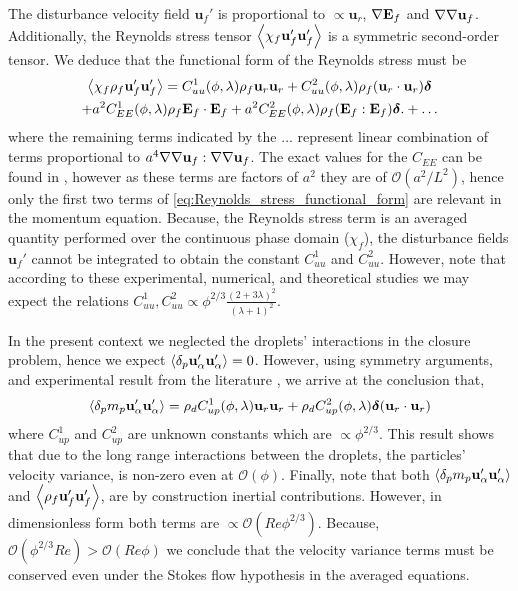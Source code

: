 The disturbance velocity field $\textbf{u}_f'$ is proportional to $\propto \textbf{u}_r$, $\mathbf{\nabla}\textbf{E}_f$ and $\mathbf{\nabla}\mathbf{\nabla} \textbf{u}_f$.
Additionally, the Reynolds stress tensor $\left<\chi_f \textbf{u}_f'\textbf{u}_f'\right>$ is a symmetric second-order tensor. 
We deduce that the functional form of the Reynolds stress must be 
\begin{multline}
    \avg{\chi_f \rho_f \textbf{u}_f' \textbf{u}_f'}
    =
    C_{uu}^1(\phi,\lambda) \rho_f \textbf{u}_{r} \textbf{u}_{r}
    + C_{uu}^2(\phi,\lambda) \rho_f (\textbf{u}_{r}\cdot  \textbf{u}_{r})\bm\delta\\
    +a^2 C_{EE}^1(\phi,\lambda) \rho_f\textbf{E}_f\cdot \textbf{E}_f 
    +  a^2 C_{EE}^2(\phi,\lambda) \rho_f (\textbf{E}_f : \textbf{E}_f)\bm\delta.
    + \ldots
    \label{eq:Reynolds_stress_functional_form}
\end{multline}
where the remaining terms indicated by the $\ldots$ represent linear combination of terms proportional to $a^4\mathbf{\nabla}\mathbf{\nabla} \textbf{u}_f:\mathbf{\nabla}\mathbf{\nabla} \textbf{u}_f$. 
The exact values for the $C_{EE}$ can be found in \citet{raja2010inertial}, however as these terms are factors of $a^2$ they are of $\mathcal{O}(a^2/L^2)$, hence only the first two terms of \ref{eq:Reynolds_stress_functional_form} are relevant in the momentum equation. 
Because, the Reynolds stress term is an averaged quantity performed over the continuous phase domain ($\chi_f$), the disturbance fields $\textbf{u}_f'$ cannot be integrated to obtain the constant $C_{uu}^1$ and $C_{uu}^2$. 
However, note that according to these experimental\citep{cartellier2009induced}, numerical, and theoretical\citep{hill2001first} studies we may expect the relations $C_{uu}^1,C_{uu}^2 \propto \phi^{2/3} \frac{(2+3\lambda)^2}{(\lambda+1)^2}$. 


In the present context we neglected the droplets' interactions in the closure problem, hence we expect $\left<\delta_{p} \textbf{u}_\alpha'\textbf{u}_\alpha'\right>=0$.
However, using symmetry arguments, and experimental result from the literature \citep{guazzelli2011fluctuations}, we arrive at the conclusion that, 
\begin{equation}
    \pavg{m_p \textbf{u}_\alpha'\textbf{u}_\alpha'}
    =
    \rho_d C^1_{up}(\phi,\lambda)\textbf{u}_r\textbf{u}_r
    + \rho_d C^2_{up}(\phi,\lambda) \bm\delta(\textbf{u}_r\cdot \textbf{u}_r)
    \label{eq:upup}
\end{equation}
where $C_{up}^1$ and $C_{up}^2$ are unknown constants which are $\propto \phi^{2/3}$\citep{guazzelli2011fluctuations}. 
This result shows that due to the long range interactions between the droplets, the particles' velocity variance, is non-zero even at $\mathcal{O(\phi)}$. 
Finally, note that both $\left<\delta_{p} m_p \textbf{u}_\alpha'\textbf{u}_\alpha'\right>$ and $\left<\rho_f \textbf{u}_f'\textbf{u}_f'\right>$, are by construction inertial contributions.
However, in dimensionless form both terms are $\propto \mathcal{O}(Re \phi^{2/3})$. 
Because,  $\mathcal{O}(\phi^{2/3}Re) > \mathcal{O}(Re\phi)$ we conclude that the velocity variance terms must be conserved even under the Stokes flow hypothesis in the averaged equations. 


